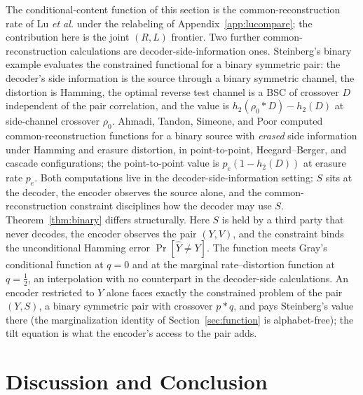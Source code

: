 \documentclass[11pt,onecolumn]{IEEEtran}
\newcommand{\hY}{\widehat{Y}}
\begin{document}
The conditional-content function of this section is the
common-reconstruction rate of Lu \emph{et al.} \cite{lu2016lossy} under
the relabeling of Appendix~\ref{app:lucompare}; the contribution here is
the joint $(R,L)$ frontier. Two further common-reconstruction
calculations are decoder-side-information ones.
Steinberg's binary example
\cite{steinberg2009} evaluates the constrained functional for a binary
symmetric pair: the decoder's side information is the source through a
binary symmetric channel, the distortion is Hamming, the optimal
reverse test channel is a BSC of crossover $D$ independent of the pair
correlation, and the value is $h_2(\rho_0*D)-h_2(D)$ at side-channel
crossover $\rho_0$. Ahmadi, Tandon, Simeone, and Poor \cite{ahmadi2013}
computed common-reconstruction functions for a binary source with
\emph{erased} side information under Hamming and erasure distortion,
in point-to-point, Heegard--Berger, and cascade configurations; the
point-to-point value is $p_e(1-h_2(D))$ at erasure rate $p_e$. Both
computations live in the decoder-side-information setting: $S$ sits at
the decoder, the encoder observes the source alone, and the
common-reconstruction constraint disciplines how the decoder may use
$S$. Theorem~\ref{thm:binary} differs structurally. Here $S$ is held
by a third party that never decodes, the encoder observes the pair
$(Y,V)$, and the constraint binds the unconditional Hamming error
$\Pr[\hY\ne Y]$. The function meets Gray's conditional
function at $q=0$ and at the marginal rate--distortion function at
$q=\tfrac12$, an interpolation with no counterpart in the
decoder-side calculations. An encoder restricted to $Y$ alone faces
exactly the constrained problem of the pair $(Y,S)$, a binary
symmetric pair with crossover $p*q$, and pays Steinberg's value there
(the marginalization identity of Section~\ref{sec:function} is
alphabet-free); the tilt equation is what the encoder's access to the
pair adds.

\section{Discussion and Conclusion}
\label{sec:discussion}
\end{document}
